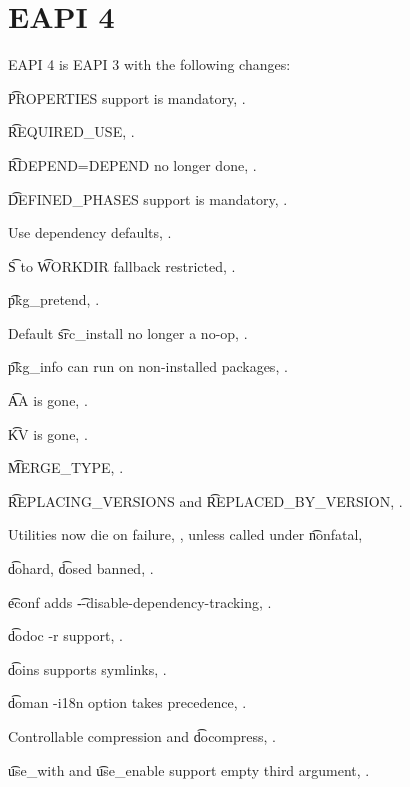 \section*{EAPI 4}

EAPI 4 is EAPI 3 with the following changes:

\begin{compactitem}
\item \t{PROPERTIES} support is mandatory, .
\item \t{REQUIRED\_USE}, .
\item \t{RDEPEND=DEPEND} no longer done, .
\item \t{DEFINED\_PHASES} support is mandatory, .
\item Use dependency defaults, .
\item \t{S} to \t{WORKDIR} fallback restricted, .
\item \t{pkg\_pretend}, .
\item Default \t{src\_install} no longer a no-op, .
\item \t{pkg\_info} can run on non-installed packages, .
\item \t{AA} is gone, .
\item \t{KV} is gone, .
\item \t{MERGE\_TYPE}, .
\item \t{REPLACING\_VERSIONS} and \t{REPLACED\_BY\_VERSION}, .
\item Utilities now die on failure, , unless called under \t{nonfatal},
\item \t{dohard}, \t{dosed} banned, .
\item \t{econf} adds \t{-{}-disable-dependency-tracking}, .
\item \t{dodoc -r} support, .
\item \t{doins} supports symlinks, .
\item \t{doman -i18n} option takes precedence, .
\item Controllable compression and \t{docompress}, .
\item \t{use\_with} and \t{use\_enable} support empty third argument, .
\end{compactitem}

